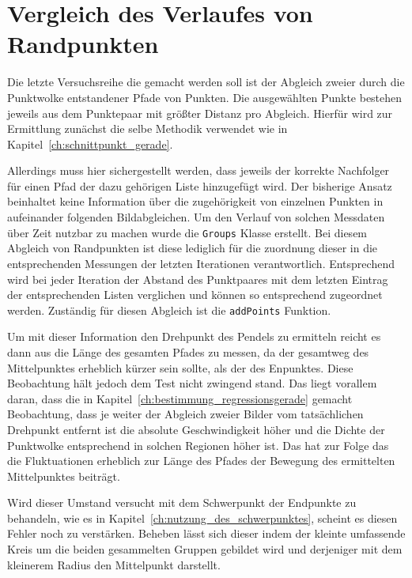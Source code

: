 \section{Vergleich des Verlaufes von Randpunkten}\label{ch:vergleich_verlauf_randpunkte}

Die letzte Versuchsreihe die gemacht werden soll ist der Abgleich zweier durch die Punktwolke entstandener Pfade von Punkten.
Die ausgewählten Punkte bestehen jeweils aus dem Punktepaar mit grö{\ss}ter Distanz pro Abgleich.
Hierfür wird zur Ermittlung zunächst die selbe Methodik verwendet wie in Kapitel~\ref{ch:schnittpunkt_gerade}.

Allerdings muss hier sichergestellt werden, dass jeweils der korrekte Nachfolger für einen Pfad der dazu gehörigen Liste hinzugefügt wird.
Der bisherige Ansatz beinhaltet keine Information über die zugehörigkeit von einzelnen Punkten in aufeinander folgenden Bildabgleichen.
Um den Verlauf von solchen Messdaten über Zeit nutzbar zu machen wurde die \lstinline{Groups} Klasse erstellt.
Bei diesem Abgleich von Randpunkten ist diese lediglich für die zuordnung dieser in die entsprechenden Messungen der letzten Iterationen verantwortlich.
Entsprechend wird bei jeder Iteration der Abstand des Punktpaares mit dem letzten Eintrag der entsprechenden Listen verglichen und können so entsprechend zugeordnet werden.
Zuständig für diesen Abgleich ist die \lstinline{addPoints} Funktion.

Um mit dieser Information den Drehpunkt des Pendels zu ermitteln reicht es dann aus die Länge des gesamten Pfades zu messen, da der gesamtweg des Mittelpunktes erheblich kürzer sein sollte, als der des Enpunktes.
Diese Beobachtung hält jedoch dem Test nicht zwingend stand.
Das liegt vorallem daran, dass die in Kapitel~\ref{ch:bestimmung_regressionsgerade} gemacht Beobachtung, dass je weiter der Abgleich zweier Bilder vom tatsächlichen Drehpunkt entfernt ist die absolute Geschwindigkeit höher und die Dichte der Punktwolke entsprechend in solchen Regionen höher ist.
Das hat zur Folge das die Fluktuationen erheblich zur Länge des Pfades der Bewegung des ermittelten Mittelpunktes beiträgt.

Wird dieser Umstand versucht mit dem Schwerpunkt der Endpunkte zu behandeln, wie es in Kapitel~\ref{ch:nutzung_des_schwerpunktes}, scheint es diesen Fehler noch zu verstärken.
Beheben lässt sich dieser indem der kleinte umfassende Kreis um die beiden gesammelten Gruppen gebildet wird und derjeniger mit dem kleinerem Radius den Mittelpunkt darstellt.

